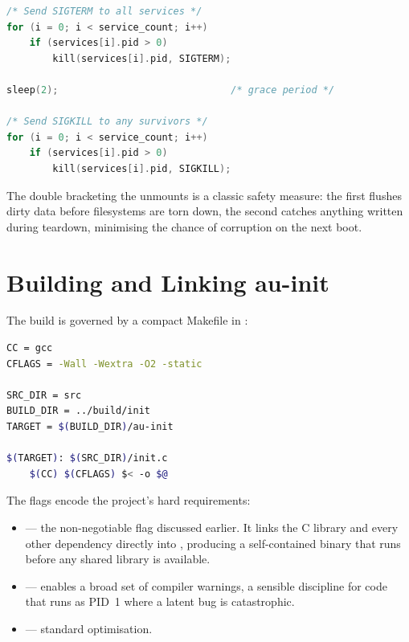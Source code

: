 \begin{lstlisting}[language=C, caption={Graceful-then-forceful service teardown}]
/* Send SIGTERM to all services */
for (i = 0; i < service_count; i++)
    if (services[i].pid > 0)
        kill(services[i].pid, SIGTERM);

sleep(2);                              /* grace period */

/* Send SIGKILL to any survivors */
for (i = 0; i < service_count; i++)
    if (services[i].pid > 0)
        kill(services[i].pid, SIGKILL);
\end{lstlisting}

The double  bracketing the unmounts is a classic safety measure:
the first flushes dirty data before filesystems are torn down, the second
catches anything written during teardown, minimising the chance of corruption on
the next boot.

\section{Building and Linking au-init}
\label{sec:init-build}

The build is governed by a compact Makefile in :

\begin{lstlisting}[language=bash, caption={The init Makefile (essential rules)}]
CC = gcc
CFLAGS = -Wall -Wextra -O2 -static

SRC_DIR = src
BUILD_DIR = ../build/init
TARGET = $(BUILD_DIR)/au-init

$(TARGET): $(SRC_DIR)/init.c
	$(CC) $(CFLAGS) $< -o $@
\end{lstlisting}

The flags encode the project's hard requirements:

\begin{itemize}
  \item {} --- the non-negotiable flag discussed earlier. It links
        the C library and every other dependency directly into ,
        producing a self-contained binary that runs before any shared library is
        available.
  \item {} --- enables a broad set of compiler warnings, a
        sensible discipline for code that runs as PID~1 where a latent bug is
        catastrophic.
  \item {} --- standard optimisation.
\end{itemize}

